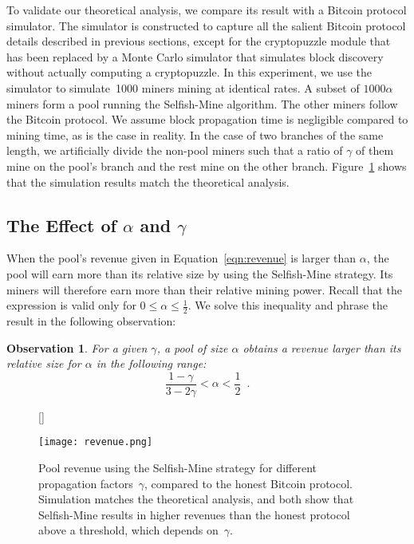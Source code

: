 \documentclass[letterpaper]{llncs}
\newtheorem{observation}{Observation}
\begin{document}
To validate our theoretical analysis, we compare its result with a Bitcoin protocol simulator. The simulator is constructed to capture all the salient Bitcoin protocol details described in previous sections, except for the cryptopuzzle module that has been replaced by a Monte Carlo simulator that simulates block discovery without actually computing a cryptopuzzle. In this experiment, we use the simulator to simulate~1000 miners mining at identical rates. A subset of $1000\alpha$ miners form a pool running the Selfish-Mine algorithm. The other miners follow the Bitcoin protocol. We assume block propagation time is negligible compared to mining time, as is the case in reality. In the case of two branches of the same length, we artificially divide the non-pool miners such that a ratio of $\gamma$ of them mine on the pool's branch and the rest mine on the other branch. Figure~\ref{fig:revenue} shows that the simulation results match the theoretical analysis. 

        \subsection{The Effect of $\alpha$ and $\gamma$} 

When the pool's revenue given in Equation~\ref{eqn:revenue} is larger than $\alpha$, the pool will earn more than its relative size by using the Selfish-Mine strategy. Its miners will therefore earn more than their relative mining power. Recall that the expression is valid only for $0 \le \alpha \le \frac{1}{2}$. We solve this inequality and phrase the result in the following observation: 

\begin{observation} \label{obs:threshold}
For a given $\gamma$, a pool of size $\alpha$ obtains a revenue larger than its relative size for $\alpha$ in the following range: 
\begin{equation}
\frac{1 - \gamma}{3 - 2\gamma}< \alpha < \frac{1}{2} \,\,\, . 
\label{eqn:threshold}
\end{equation} 
\end{observation}

\begin{figure}[t]
[\FBwidth]{
\caption{
Pool revenue using the Selfish-Mine strategy for different propagation factors~$\gamma$, compared to the honest Bitcoin protocol. 
Simulation matches the theoretical analysis, and both show that Selfish-Mine results in higher revenues than the honest protocol above a threshold, which depends on~$\gamma$. 
}
\label{fig:revenue}
}{
\texttt{[image: revenue.png]}
}
\end{figure}
\end{document}
